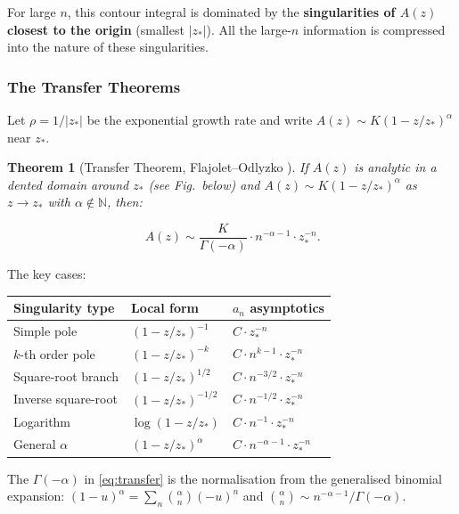 \documentclass[11pt,a4paper]{article}
\newtheorem{theorem}{Theorem}[section]
\theoremstyle{definition}
\newcommand{\N}{\mathbb{N}}
\begin{document}
For large $n$, this contour integral is dominated by the \textbf{singularities of
$A(z)$ closest to the origin} (smallest $|z_*|$). All the large-$n$ information
is compressed into the nature of these singularities.

\subsubsection{The Transfer Theorems}

Let $\rho = 1/|z_*|$ be the exponential growth rate and write $A(z) \sim K(1-z/z_*)^\alpha$
near $z_*$.

\begin{theorem}[Transfer Theorem, Flajolet--Odlyzko \cite{flajoletodlyzko1990}]
If $A(z)$ is analytic in a \emph{dented domain} around $z_*$ (see Fig.~below)
and $A(z) \sim K(1 - z/z_*)^\alpha$ as $z\to z_*$ with $\alpha \notin \N$, then:

\begin{equation}
  [z^n]\,A(z) \sim \frac{K}{\Gamma(-\alpha)}\cdot n^{-\alpha-1} \cdot z_*^{-n}.
  \label{eq:transfer}
\end{equation}
\end{theorem}

\noindent The key cases:

\begin{center}
\begin{tabular}{lll}
\toprule
Singularity type & Local form & $a_n$ asymptotics \\
\midrule
Simple pole & $(1 - z/z_*)^{-1}$ & $C \cdot z_*^{-n}$ \\
$k$-th order pole & $(1 - z/z_*)^{-k}$ & $C \cdot n^{k-1} \cdot z_*^{-n}$ \\
Square-root branch & $(1-z/z_*)^{1/2}$ & $C \cdot n^{-3/2} \cdot z_*^{-n}$ \\
Inverse square-root & $(1-z/z_*)^{-1/2}$ & $C \cdot n^{-1/2} \cdot z_*^{-n}$ \\
Logarithm & $\log(1-z/z_*)$ & $C \cdot n^{-1} \cdot z_*^{-n}$ \\
General $\alpha$ & $(1-z/z_*)^\alpha$ & $C \cdot n^{-\alpha-1} \cdot z_*^{-n}$ \\
\bottomrule
\end{tabular}
\end{center}

The $\Gamma(-\alpha)$ in \eqref{eq:transfer} is the normalisation from the
generalised binomial expansion: $(1-u)^\alpha = \sum_n \binom{\alpha}{n}(-u)^n$
and $\binom{\alpha}{n} \sim n^{-\alpha-1}/\Gamma(-\alpha)$.
\end{document}
